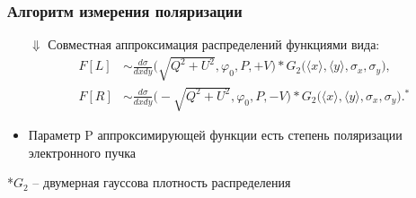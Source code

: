 \documentclass[12pt,aspectratio=169]{beamer}
\begin{document}
\begin{frame}[t]
	\frametitle{Алгоритм измерения поляризации}
	\begin{itemize}
		\item[$\Downarrow$] Совместная аппроксимация распределений функциями вида:
		\begin{align*}
		F[L] &\sim \frac{d\sigma}{dxdy}\big(\sqrt{Q^2+U^2}, \varphi_0, P, +V \big) * G_2\big(\langle x\rangle, \langle y\rangle,\sigma_x, \sigma_y\big),\\
		F[R] &\sim \frac{d\sigma}{dxdy} \big(-\sqrt{Q^2+U^2}, \varphi_0, P, -V \big) * G_2\big(\langle x\rangle, \langle y\rangle,\sigma_x, \sigma_y\big).^*
		\end{align*}
		\item  Параметр P аппроксимирующей функции есть степень поляризации электронного пучка
	\end{itemize}
\flushleft
\footnotesize{*$G_2$ -- двумерная гауссова плотность распределения}	
\end{frame}
\end{document}
